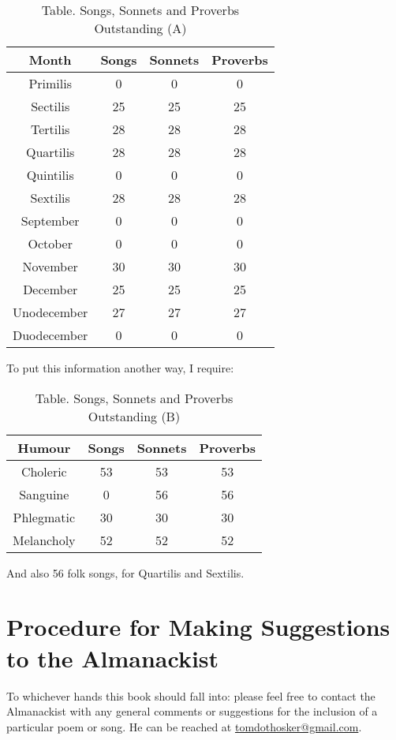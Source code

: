 \documentclass[0main.tex]{subfiles}
\begin{document}
\begin{table}[h]
\centering
\caption*{{\sc Table.} Songs, Sonnets and Proverbs Outstanding (A)}
\begin{tabular}{c||c|c|c}
{\sc Month} & {\sc Songs} & {\sc Sonnets} & {\sc Proverbs}\\ \hline \hline
Primilis & 0 & 0 & 0 \\ \hline
Sectilis & 25 & 25 & 25 \\ \hline
Tertilis & 28 & 28 & 28 \\ \hline
Quartilis & 28 & 28 & 28 \\ \hline
Quintilis & 0 & 0 & 0 \\ \hline
Sextilis & 28 & 28 & 28 \\ \hline
September & 0 & 0 & 0 \\ \hline
October & 0 & 0 & 0 \\ \hline
November & 30 & 30 & 30 \\ \hline
December & 25 & 25 & 25 \\ \hline
Unodecember & 27 & 27 & 27 \\ \hline
Duodecember & 0 & 0 & 0
\end{tabular}
\end{table}

To put this information another way, I require:

\newpage

\begin{table}[h]
\centering
\caption*{{\sc Table.} Songs, Sonnets and Proverbs Outstanding (B)}
\begin{tabular}{c||c|c|c}
{\sc Humour} & {\sc Songs} & {\sc Sonnets} & {\sc Proverbs}\\ \hline \hline
Choleric & 53 & 53 & 53 \\ \hline
Sanguine & 0 & 56 & 56 \\ \hline
Phlegmatic & 30 & 30 & 30 \\ \hline
Melancholy & 52 & 52 & 52 \\
\end{tabular}
\end{table}

And also 56 folk songs, for Quartilis and Sextilis.

\section{Procedure for Making Suggestions to the Almanackist}

To whichever hands this book should fall into: please feel free to contact the Almanackist with any general comments or suggestions for the inclusion of a particular poem or song. He can be reached at \url{tomdothosker@gmail.com}.
\end{document}
